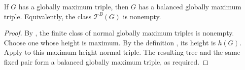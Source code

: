 \begin{lemma}
If $G$ has a globally maximum triple, then $G$ has a balanced globally
maximum triple.  Equivalently, the class $\mathcal T^B(G)$ is nonempty.
\end{lemma}
\begin{proof}
By , the finite class of normal globally
maximum triples is nonempty.  Choose one whose height is maximum.  By the
definition , its height is $h(G)$.  Apply
 to this maximum-height normal
triple.  The resulting tree and the same fixed pair form a balanced
globally maximum triple, as required.
\end{proof}
